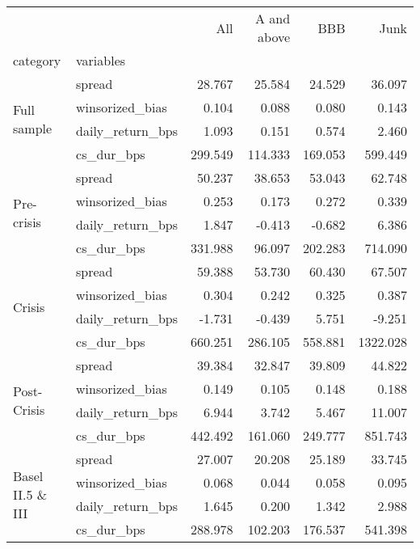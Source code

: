 \small %
\begin{tabular}{l@{\hspace{30pt}} l@{\hspace{60pt}} r@{\hspace{30pt}} r@{\hspace{10pt}} r@{\hspace{10pt}} r}
\toprule
 &  & All & A and above & BBB & Junk \\
category & variables &  &  &  &  \\
\midrule
\multirow[t]{4}{*}{Full sample} & spread & 28.767 & 25.584 & 24.529 & 36.097 \\
 & winsorized\_bias & 0.104 & 0.088 & 0.080 & 0.143 \\
 & daily\_return\_bps & 1.093 & 0.151 & 0.574 & 2.460 \\
 & cs\_dur\_bps & 299.549 & 114.333 & 169.053 & 599.449 \\
\cline{1-6}
\multirow[t]{4}{*}{Pre-crisis} & spread & 50.237 & 38.653 & 53.043 & 62.748 \\
 & winsorized\_bias & 0.253 & 0.173 & 0.272 & 0.339 \\
 & daily\_return\_bps & 1.847 & -0.413 & -0.682 & 6.386 \\
 & cs\_dur\_bps & 331.988 & 96.097 & 202.283 & 714.090 \\
\cline{1-6}
\multirow[t]{4}{*}{Crisis} & spread & 59.388 & 53.730 & 60.430 & 67.507 \\
 & winsorized\_bias & 0.304 & 0.242 & 0.325 & 0.387 \\
 & daily\_return\_bps & -1.731 & -0.439 & 5.751 & -9.251 \\
 & cs\_dur\_bps & 660.251 & 286.105 & 558.881 & 1322.028 \\
\cline{1-6}
\multirow[t]{4}{*}{Post-Crisis} & spread & 39.384 & 32.847 & 39.809 & 44.822 \\
 & winsorized\_bias & 0.149 & 0.105 & 0.148 & 0.188 \\
 & daily\_return\_bps & 6.944 & 3.742 & 5.467 & 11.007 \\
 & cs\_dur\_bps & 442.492 & 161.060 & 249.777 & 851.743 \\
\cline{1-6}
\multirow[t]{4}{*}{Basel II.5 \& III} & spread & 27.007 & 20.208 & 25.189 & 33.745 \\
 & winsorized\_bias & 0.068 & 0.044 & 0.058 & 0.095 \\
 & daily\_return\_bps & 1.645 & 0.200 & 1.342 & 2.988 \\
 & cs\_dur\_bps & 288.978 & 102.203 & 176.537 & 541.398 \\

\end{tabular}
